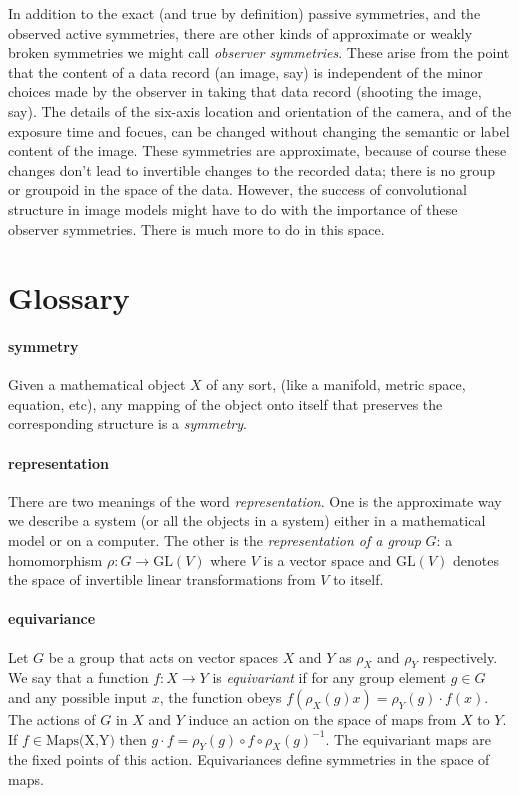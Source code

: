 \documentclass{article}
\theoremstyle{plain}
\theoremstyle{definition}
\theoremstyle{remark}
\begin{document}

In addition to the exact (and true by definition) passive symmetries, and the observed active symmetries, there are other kinds of approximate or weakly broken symmetries we might call \emph{observer symmetries}.
These arise from the point that the content of a data record (an image, say) is independent of the minor choices made by the observer in taking that data record (shooting the image, say).
The details of the six-axis location and orientation of the camera, and of the exposure time and focues, can be changed without changing the semantic or label content of the image.
These symmetries are approximate, because of course these changes don't lead to invertible changes to the recorded data; there is no group or groupoid in the space of the data.
However, the success of convolutional structure in image models might have to do with the importance of these observer symmetries.
There is much more to do in this space.

{\raggedright


}

\newpage\appendix\onecolumn
\section{Glossary}
\paragraph{symmetry}
Given a mathematical object $X$ of any sort, (like a manifold, metric space, equation, etc), any mapping of the object onto itself that preserves the corresponding structure is a \emph{symmetry}.

\paragraph{representation}
There are two meanings of the word \emph{representation}. One is the approximate way we describe a system (or all the objects in a system) either in a mathematical model or on a computer.
The other is the \emph{representation of a group} $G$: a homomorphism $\rho: G\to \text{GL}(V)$ where $V$ is a vector space and $\text{GL}(V)$ denotes the space of invertible linear transformations from $V$ to itself.

\paragraph{equivariance}
Let $G$ be a group that acts on vector spaces $X$ and $Y$ as $\rho_X$ and $\rho_Y$ respectively. We say that a function $f:X\to Y$ is \emph{equivariant} if for any group element $g\in G$ and any possible input $x$, the function obeys $f( \rho_X(g) x) = \rho_Y(g)\cdot f(x)$.
The actions of $G$ in $X$ and $Y$ induce an action on the space of maps from $X$ to $Y$. If $f\in \text{Maps(X,Y)}$ then $g\cdot f = \rho_Y(g)\circ f \circ \rho_X(g)^{-1}$.
The equivariant maps are the fixed points of this action.
Equivariances define symmetries in the space of maps. 
\end{document}
